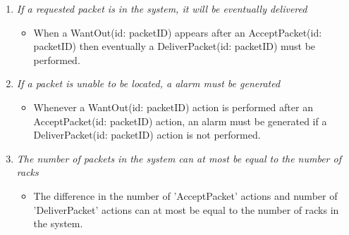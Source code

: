 \begin{enumerate}
\item \textit{If a requested packet is in the system, it will be
	eventually delivered}
	\begin{itemize}
	\item When a WantOut(id: packetID) appears after an AcceptPacket(id: 
	packetID) then eventually a DeliverPacket(id: packetID) must be
	performed.  
	\end{itemize}
	
\item \textit{If a packet is unable to be located, a alarm must 
	be generated}
	\begin{itemize}	
	\item  Whenever a WantOut(id: packetID) action is performed after an 
	AcceptPacket(id: packetID) action, an alarm must be generated if a 
	DeliverPacket(id: packetID) action is not performed.
	\end{itemize}
		
\item \textit{The number of packets in the system can at most be equal to the number of racks}
	\begin{itemize}
	\item The difference in the number of 'AcceptPacket'
	actions and number of 'DeliverPacket' actions can at most be 
	equal to the number of racks in the system.
	\end{itemize}
\end{enumerate}

